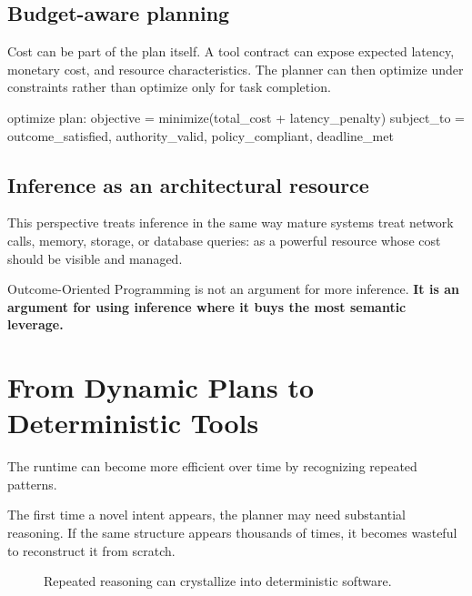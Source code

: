 \documentclass[10pt,oneside,openany]{book}
\begin{document}
\section{Budget-aware planning}
Cost can be part of the plan itself. A tool contract can expose expected latency, monetary cost, and resource characteristics. The planner can then optimize under constraints rather than optimize only for task completion.

\begin{codeblock}
optimize plan:
  objective = minimize(total_cost + latency_penalty)
  subject_to = {
    outcome_satisfied,
    authority_valid,
    policy_compliant,
    deadline_met
  }
\end{codeblock}

\section{Inference as an architectural resource}
This perspective treats inference in the same way mature systems treat network calls, memory, storage, or database queries: as a powerful resource whose cost should be visible and managed.

Outcome-Oriented Programming is not an argument for more inference. \textbf{It is an argument for using inference where it buys the most semantic leverage.}

\chapter{From Dynamic Plans to Deterministic Tools}

The runtime can become more efficient over time by recognizing repeated patterns.

The first time a novel intent appears, the planner may need substantial reasoning. If the same structure appears thousands of times, it becomes wasteful to reconstruct it from scratch.

\begin{figure}[ht]
\centering
{}
\caption{Repeated reasoning can crystallize into deterministic software.}
\end{figure}
\end{document}
